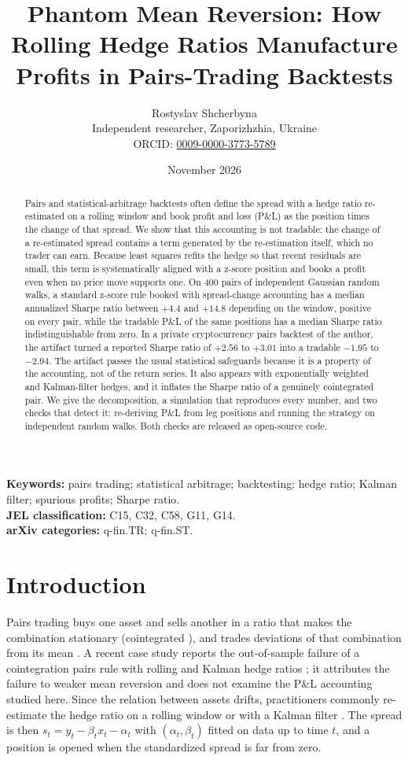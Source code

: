 \documentclass[11pt]{article}
\title{Phantom Mean Reversion: How Rolling Hedge Ratios Manufacture\\ Profits in Pairs-Trading Backtests}
\author{Rostyslav Shcherbyna\\ Independent researcher, Zaporizhzhia, Ukraine\\
ORCID: \href{https://orcid.org/0009-0000-3773-5789}{0009-0000-3773-5789}}
\date{November 2026}
\theoremstyle{remark}
\begin{document}
\maketitle

\begin{abstract}
Pairs and statistical-arbitrage backtests often define the spread with a hedge ratio re-estimated on a rolling
window and book profit and loss (P\&L) as the position times the change of that spread. We show that this
accounting is not tradable: the change of a re-estimated spread contains a term generated by the re-estimation
itself, which no trader can earn. Because least squares refits the hedge so that recent residuals are
small, this term is systematically aligned with a z-score position and books a profit even when no price move
supports one. On 400 pairs of independent Gaussian random walks, a standard z-score rule booked with spread-change
accounting has a median annualized Sharpe ratio between $+4.4$ and $+14.8$ depending on the window, positive on every
pair, while the tradable P\&L of the same positions has a median Sharpe ratio indistinguishable from zero. In a private
cryptocurrency pairs backtest of the author, the artifact turned a reported Sharpe ratio of $+2.56$ to $+3.01$ into a tradable
$-1.95$ to $-2.94$. The artifact passes the usual statistical safeguards because it is a property of the accounting, not
of the return series. It also appears with exponentially weighted and Kalman-filter hedges, and it inflates the Sharpe
ratio of a genuinely cointegrated pair. We give the decomposition, a simulation that reproduces every number, and two
checks that detect it: re-deriving P\&L from leg positions and running the strategy on independent random walks.
Both checks are released as open-source code.
\end{abstract}

\noindent\textbf{Keywords:} pairs trading; statistical arbitrage; backtesting; hedge ratio; Kalman filter; spurious
profits; Sharpe ratio.\\
\textbf{JEL classification:} C15, C32, C58, G11, G14.\\
\textbf{arXiv categories:} q-fin.TR; q-fin.ST.

\section{Introduction}

Pairs trading buys one asset and sells another in a ratio that makes the combination stationary (cointegrated \cite{engle1987}), and trades
deviations of that combination from its mean \cite{vidyamurthy2004,gatev2006,doFaff2010,doFaff2012,krauss2017}. A recent case study reports the out-of-sample failure of a cointegration pairs rule with rolling and Kalman hedge ratios \cite{graziano2026}; it attributes the failure to weaker mean reversion and does not examine the P\&L accounting studied here. Since the relation between
assets drifts, practitioners commonly re-estimate the hedge ratio on a rolling window or with a Kalman filter
\cite{chan2013}. The spread is then $s_t = y_t - \beta_t x_t - \alpha_t$ with $(\alpha_t,\beta_t)$ fitted on data
up to time $t$, and a position is opened when the standardized spread is far from zero.
\end{document}
